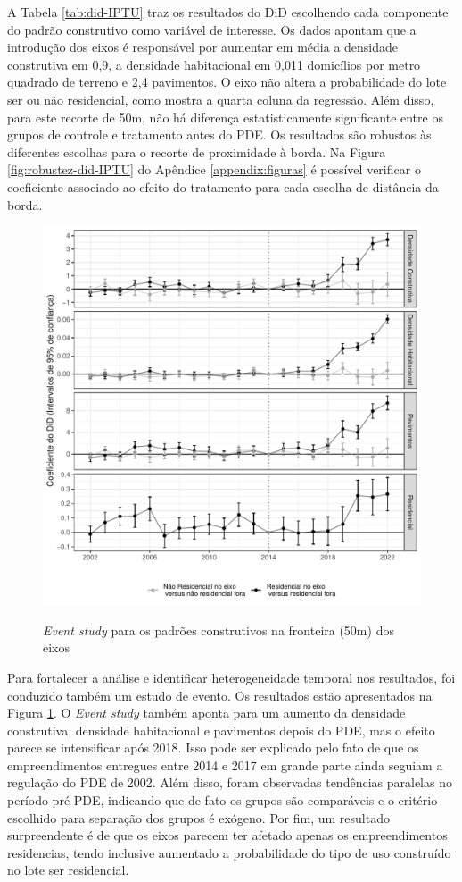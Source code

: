 

A Tabela \ref{tab:did-IPTU} traz os resultados do DiD escolhendo cada componente do padrão construtivo como variável de interesse. Os dados apontam que a introdução dos eixos é responsável por aumentar em média a densidade construtiva em 0,9, a densidade habitacional em 0,011 domicílios por metro quadrado de terreno e 2,4 pavimentos. O eixo não altera a probabilidade do lote ser ou não residencial, como mostra a quarta coluna da regressão. Além disso, para este recorte de 50m, não há diferença estatisticamente significante entre os grupos de controle e tratamento antes do PDE. Os resultados são robustos às diferentes escolhas para o recorte de proximidade à borda. Na Figura \ref{fig:robustez-did-IPTU} do Apêndice \ref{appendix:figuras} é possível verificar o coeficiente associado ao efeito do tratamento para cada escolha de distância da borda. 

\begin{figure}[!h]
    \centering
    \caption{\textit{Event study} para os padrões construtivos na fronteira (50m) dos eixos}
    \includegraphics[width = .9\textwidth]{figuras/event-study.pdf}
    \label{fig:event-study}
\end{figure}

Para fortalecer a análise e identificar heterogeneidade temporal nos resultados, foi conduzido também um estudo de evento. Os resultados estão apresentados na Figura \ref{fig:event-study}. O \textit{Event study} também aponta para um aumento da densidade construtiva, densidade habitacional e pavimentos depois do PDE, mas o efeito parece se intensificar após 2018. Isso pode ser explicado pelo fato de que os empreendimentos entregues entre 2014 e 2017 em grande parte ainda seguiam a regulação do PDE de 2002. Além disso, foram observadas tendências paralelas no período pré PDE, indicando que de fato os grupos são comparáveis e o critério escolhido para separação dos grupos é exógeno. Por fim, um resultado surpreendente é de que os eixos parecem ter afetado apenas os empreendimentos residencias, tendo inclusive aumentado a probabilidade do tipo de uso construído no lote ser residencial.

